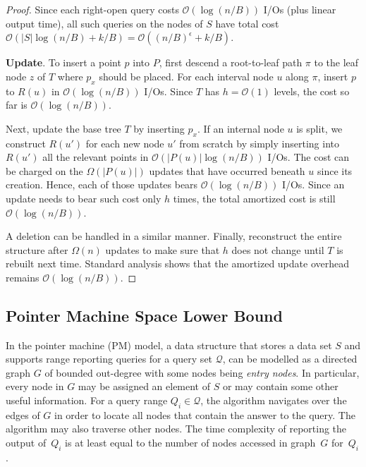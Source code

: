 \documentclass{sig-alternate}
\def\eps{\epsilon}
\def\extraspacing{\vspace{2mm} \noindent}
\def\eps{\epsilon}
\newcommand{\bigO}{\mathcal{O}}
\renewcommand{\(}{\left(}
\renewcommand{\)}{\right)}
\begin{document}
\begin{fullenv}
\begin{proof}
Since each right-open query costs $\bigO(\log (n/B))$ I/Os (plus linear output
time), all such queries on the nodes of $S$ have total cost $\bigO(|S| \log
(n/B) + k/B) = \bigO((n/B)^\eps + k/B)$.

\extraspacing \textbf{Update}. To insert a point $p$ into $P$, first
descend a root-to-leaf path $\pi$ to the leaf node $z$ of $T$ where $p_x$
should be placed. For each interval node $u$ along $\pi$, insert $p$ to $R(u)$
in $\bigO(\log (n/B))$ I/Os. Since $T$ has $h = \bigO(1)$ levels, the cost so
far is $\bigO(\log (n/B))$.

Next, update the base tree $T$ by inserting $p_x$. If an internal node $u$ is
split, we construct $R(u')$ for each new node $u'$ from scratch by simply
inserting into $R(u')$ all the relevant points in $\bigO(|P(u)| \log (n/B))$
I/Os. The cost can be charged on the $\Omega(|P(u)|)$ updates that have
occurred beneath $u$ since its creation. Hence, each of those updates bears
$\bigO(\log(n/B))$ I/Os. Since an update needs to bear such cost only $h$
times, the total amortized cost is still $\bigO(\log(n/B))$.

A deletion can be handled in a similar manner. Finally, reconstruct the entire
structure after $\Omega(n)$ updates to make sure that $h$ does not change until
$T$ is rebuilt next time. Standard analysis shows that the amortized update
overhead remains $\bigO(\log(n/B))$.
\end{proof}

\subsection{Pointer Machine Space Lower Bound}


In the pointer machine (PM) model, a data structure that stores a data set $S$
and supports range reporting queries for a query set $\mathcal{Q}$, can be
modelled as a directed graph $G$ of bounded out-degree with some nodes being
\emph{entry nodes}. In particular, every node in $G$ may be assigned an element
of $S$ or may contain some other useful information. For a query range $Q_i\in
\mathcal{Q}$, the algorithm navigates over the edges of $G$ in order to locate
all nodes that contain the answer to the query. The algorithm may also traverse
other nodes. The time complexity of reporting the output of~$Q_i$ is at least
equal to the number of nodes accessed in graph~$G$ for~$Q_i$.


\end{fullenv}
\end{document}
